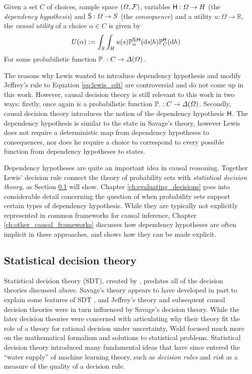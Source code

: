 \begin{definition}
Given a set $C$ of choices, sample space $(\Omega,\mathcal{F})$, variables $\mathsf{H}:\Omega\to H$ (the \emph{dependency hypothesis}) and $\mathsf{S}:\Omega\to S$ (the \emph{consequence}) and a utility $u:\Omega\to \mathbb{R}$, the \emph{causal utility} of a choice $\alpha\in C$ is given by
\begin{align}
    U(\alpha) := \int_S \int_H u(s) \mathbb{P}_\alpha^{\mathsf{S}|\mathsf{H}}(\mathrm{d}s|h) \mathbb{P}_C^{\mathsf{H}}(\mathrm{d}h)\label{eq:lewis_cdt}
\end{align}
For some probabilistic function $\mathbb{P}_\cdot:C\to \Delta(\Omega)$.
\end{definition}

The reasons why Lewis wanted to introduce dependency hypothesis and modify Jeffrey's rule to Equation \ref{eq:lewis_cdt} are controversial and do not come up in this work. However, causal decision theory is still relevant to this work in two ways: firstly, once again is a probabilistic function $\mathbb{P}_\cdot:C\to \Delta(\Omega)$. Secondly, causal decision theory introduces the notion of the dependency hypothesis $\mathsf{H}$. The dependency hypothesis is similar to the state in Savage's theory, however Lewis does not require a deterministic map from dependency hypotheses to consequences, nor does he require a choice to correspond to every possible function from dependency hypotheses to states.

Dependency hypotheses are quite an important idea in causal reasoning. Together Lewis' decision rule connect the theory of probability sets with \emph{statistical decision theory}, as Section \ref{sec:sdt} will show. Chapter \ref{ch:evaluating_decisions} goes into considerable detail concerning the question of when probability sets support certain types of dependency hypothesis. While they are typically not explicitly represented in common frameworks for causal inference, Chapter \ref{ch:other_causal_frameworks} discusses how dependency hypotheses are often implicit in these approaches, and shows how they can be made explicit.

\subsection{Statistical decision theory}\label{sec:sdt}

Statistical decision theory (SDT), created by \citet{wald_statistical_1950}, predates all of the decision theories discussed above. Savage's theory appears to have developed in part to explain some features of SDT \citet{savage_theory_1951}, and Jeffrey's theory and subsequent causal decision theories were in turn influenced by Savage's decision theory. While the later decision theories were concerned with articulating why their theory fit the role of a theory for rational decision under uncertainty, Wald focused much more on the mathematical formalism and solutions to statistical problems. Statistical decision theory introduced many fundamental ideas that have since entered the ``water supply'' of machine learning theory, such as \emph{decision rules} and \emph{risk} as a measure of the quality of a decision rule.

